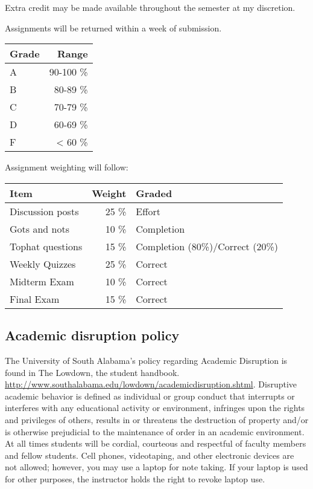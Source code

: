 \documentclass[11pt,]{article}
\begin{document}
Extra credit may be made available throughout the semester at my
discretion.

Assignments will be returned within a week of submission.

\begin{longtable}[]{@{}lr@{}}
\toprule()
Grade & Range \\
\midrule()
\endhead
A & 90-100 \% \\
B & 80-89 \% \\
C & 70-79 \% \\
D & 60-69 \% \\
F & \textless{} 60 \% \\
\bottomrule()
\end{longtable}

Assignment weighting will follow:

\begin{longtable}[]{@{}lrl@{}}
\toprule()
Item & Weight & Graded \\
\midrule()
\endhead
Discussion posts & 25 \% & Effort \\
Gots and nots & 10 \% & Completion \\
Tophat questions & 15 \% & Completion (80\%)/Correct (20\%) \\
Weekly Quizzes & 25 \% & Correct \\
Midterm Exam & 10 \% & Correct \\
Final Exam & 15 \% & Correct \\
\bottomrule()
\end{longtable}

\hypertarget{academic-disruption-policy}{%
\subsection{Academic disruption
policy}\label{academic-disruption-policy}}

The University of South Alabama's policy regarding Academic Disruption
is found in The Lowdown, the student handbook.
\url{http://www.southalabama.edu/lowdown/academicdisruption.shtml}.
Disruptive academic behavior is defined as individual or group conduct
that interrupts or interferes with any educational activity or
environment, infringes upon the rights and privileges of others, results
in or threatens the destruction of property and/or is otherwise
prejudicial to the maintenance of order in an academic environment. At
all times students will be cordial, courteous and respectful of faculty
members and fellow students. Cell phones, videotaping, and other
electronic devices are not allowed; however, you may use a laptop for
note taking. If your laptop is used for other purposes, the instructor
holds the right to revoke laptop use.
\end{document}
